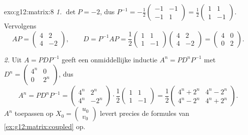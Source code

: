 \begin{solution}{exo:g12:matrix:8}
\emph{1.} $\det P = -2$, dus
$P^{-1} = -\frac12\begin{pmatrix} -1 & -1\\ -1 & 1\end{pmatrix}
= \frac12\begin{pmatrix} 1 & 1\\ 1 & -1\end{pmatrix}$. Vervolgens
\[
AP = \begin{pmatrix} 4 & 2\\ 4 & -2 \end{pmatrix}, \qquad
D = P^{-1}AP = \frac12\begin{pmatrix} 1&1\\1&-1\end{pmatrix}
\begin{pmatrix} 4&2\\4&-2\end{pmatrix}
= \begin{pmatrix} 4 & 0\\ 0 & 2\end{pmatrix}.
\]

\emph{2.} Uit $A = PDP^{-1}$ geeft een onmiddellijke inductie
$A^n = PD^nP^{-1}$ met
$D^n = \begin{pmatrix} 4^n & 0\\ 0 & 2^n\end{pmatrix}$, dus
\[
A^n = P D^n P^{-1}
= \begin{pmatrix} 4^n & 2^n\\ 4^n & -2^n\end{pmatrix}\cdot
\frac12\begin{pmatrix} 1&1\\1&-1\end{pmatrix}
= \frac12\begin{pmatrix} 4^n + 2^n & 4^n - 2^n\\
4^n - 2^n & 4^n + 2^n\end{pmatrix}.
\]
$A^n$ toepassen op $X_0 = \begin{pmatrix} u_0\\v_0\end{pmatrix}$ levert
precies de formules van \cref{ex:g12:matrix:coupled} op.
\end{solution}

